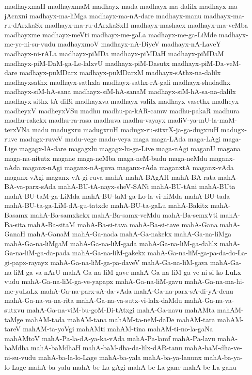{madhayxmaH
madhayxmaM
madhayx-mada
madhayx-ma-dalilx
madhayx-ma-jAcnxni
madhayx-ma-liMga
madhayx-ma-nA-dare
madhayx-manu
madhayx-ma-ru-dArxkaSx
madhayx-ma-ru-dArxkaSxH
madhayx-mashacx
madhayx-ma-veMba
madhayxme
madhayx-meVti
madhayx-me-gaLa
madhayx-me-ga-LiMde
madhayx-me-ye-ni-su-vudu
madhayxmoV
madhayx-nA-DiyeV
madhayx-nA-LaveY
madhayx-ni-rALa
madhayx-piMDa
madhayx-piMDaH
madhayx-piMDaM
madhayx-piM-DaM-ga-Le-lalxvU
madhayx-piM-Dasutx
madhayx-piM-Da-veM-dare
madhayx-puMDarx
madhayx-puMDarxM
madhayx-sAthx-na-dalilx
madhayxsathx
madhayx-sathxla
madhayx-sathx-rA-gali
madhayx-shudadhx
madhayx-siM-hA-sana
madhayx-siM-hA-sanaM
madhayx-siM-hA-sa-na-dalilx
madhayx-sithx-tA-diBi
madhayxva
madhayx-valilx
madhayx-vasethx
madheyx
madheyxV
madheyxVSu
madhu
madhu-pa-kAR-camw
madhu-pakaR
madhura
madhu-rakekx
madhu-ra-rasa
madhuva
madhu-vayayx
madiV-ya-mU-la-maM-terxVNa
madu
madugxru
madugxruH
madugx-ru-sitxrX-ja-ga-dugxruH
madugx-ruve
madugx-ruveV
madu-vege
madu-veya
maga
maga-LAda
maga-LAgi
maga-Lige
magagx-lA-dare
magagxlu
magagx-lu-ga-Live
maga-nAgi
maganU
magana
maga-na-nitutx
magane
maga-neMba
maga-neM-budu
maga-neMdu
maganx-nAda
maganx-nAgi
maganx-nA-guva
maganx-rAda
maganxtA
maganx-vAda
maganx-vAgi
maganx-vA-gi-ruva
mahA
mahA-BAgAH
mahA-BA-rata
mahA-BA-va-parx-sAda
mahA-BU-tA-nayx-sheV-SANi
mahA-BU-tAni
mahA-BUta
mahA-BU-taM-ga-LiMda
mahA-BU-taM-ga-Lo-la-vi-niMda
mahA-BU-tada
mahA-BU-ta-ga-LiM-dA-gu-tatxde
mahA-BU-ta-gaLu
mahA-Bakitx
mahA-Basamx
mahA-Ba-samxkekx
mahA-Ba-samx-veMdu
mahA-Ba-semxVti
mahA-Ba-sita
mahA-Ba-sitaM
mahA-Ba-si-tava
mahA-Ba-si-tave
mahA-Gana
mahA-GanaH
mahA-GanaM
mahA-Ga-nada
mahA-Ga-nakekx
mahA-Ga-na-liMga
mahA-Ga-na-liMgaM
mahA-Ga-na-liM-gada
mahA-Ga-na-liM-ga-dalilx
mahA-Ga-na-liM-ga-da-pada
mahA-Ga-na-liM-gakekx
mahA-Ga-na-liM-ga-pa-da-do-La-gi-papx-rayayx
mahA-Ga-na-liM-ga-pa-daveV
mahA-Ga-na-liM-gava
mahA-Ga-na-liM-ga-va-nArU
mahA-Ga-na-liM-gave
mahA-Ga-na-liM-ga-ve-ni-si-ko-LuLx-vudu
mahA-Ga-na-liM-ga-ve-yapapx
mahA-Ga-na-liM-gavu
mahA-Ga-na-ma-hi-me-yuLaLx
mahA-Ga-na-parx-sA-da-vAda
mahA-Ga-na-parx-sA-di-yA-denu
mahA-Ga-na-va-na-rita
mahA-Ga-na-va-sutx-vi-lalx-daMdu
mahA-Ga-na-va-sutxvu
mahA-Ga-na-viM-bu-goM-Di-tAtxgi
mahA-Ga-navu
mahAMta
mahAM-taMge
mahAM-tada
mahAM-tana
mahAM-ta-neM-daDe
mahAM-tara
mahAM-tareV
mahAM-ta-yoVgi
mahAMti
mahAM-tina
mahAM-ti-no-la-gaNa
mahAMtoV
mahA-Pa-la-dA-ya-ka-vAda
mahA-Pa-lamf
mahA-Pa-lavu
mahA-baMdha
mahA-baMdhaH
mahA-baM-dha-da-lilx-dAR-tanu
mahA-baM-dha-ve-ni-su-vudu
mahA-ba-la-lo-Lage
mahA-ba-yala
mahA-ba-ya-lanunx
mahA-ba-ya-lo-Lage
mahA-ba-yalu
mahA-be-La-gAgi
mahA-be-La-gane
mahA-be-La-ganu
}
